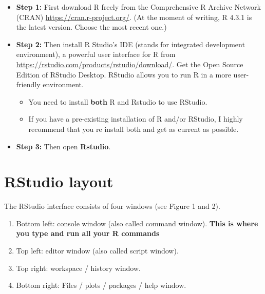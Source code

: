 \documentclass[
]{book}
\begin{document}
\begin{itemize}
\item
  \textbf{Step 1:} First download R freely from the Comprehensive R Archive Network (CRAN) \url{https://cran.r-project.org/}.
  (At the moment of writing, R 4.3.1 is the latest version. Choose the most recent one.)
\item
  \textbf{Step 2:} Then install R Studio's IDE (stands for integrated development environment), a powerful user interface for R from \url{https://rstudio.com/products/rstudio/download/}. Get the Open Source Edition of RStudio Desktop. RStudio allows you to run R in a more user-friendly environment.

  \begin{itemize}
  \item
    You need to install \textbf{both} R and Rstudio to use RStudio.
  \item
    If you have a pre-existing installation of R and/or RStudio, I highly recommend that you re install both and get as current as possible.
  \end{itemize}
\item
  \textbf{Step 3:} Then open \textbf{Rstudio}.
\end{itemize}

\hypertarget{rstudio-layout-1}{%
\section{RStudio layout}\label{rstudio-layout-1}}

The RStudio interface consists of four windows (see Figure 1 and 2).

\begin{enumerate}
\def\labelenumi{\arabic{enumi}.}
\item
  Bottom left: console window (also called command window). \textbf{This is where you type and run all your R commands}
\item
  Top left: editor window (also called script window).
\item
  Top right: workspace / history window.
\item
  Bottom right: Files / plots / packages / help window.
\end{enumerate}
\end{document}
